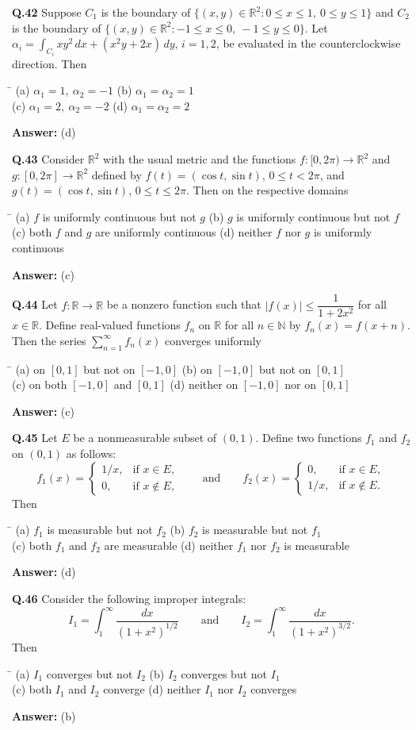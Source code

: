 \documentclass[11pt,a4paper]{article}
\newcommand{\optsfour}[4]{%
  \begin{tabbing}
    \hspace{0.48\linewidth}\=\kill
    (a) #1 \> (b) #2 \\[2pt]
    (c) #3 \> (d) #4
  \end{tabbing}%
}
\newcommand{\ans}[1]{\textbf{Answer:} #1\par\medskip}
\begin{document}
\textbf{Q.42} Suppose $C_1$ is the boundary of $\{(x,y) \in \mathbb{R}^2 : 0 \le x \le 1,\ 0 \le y \le 1\}$ and $C_2$ is the boundary of $\{(x,y) \in \mathbb{R}^2 : -1 \le x \le 0,\ -1 \le y \le 0\}$. Let $\alpha_i = \displaystyle\int_{C_i} xy^2\,dx + (x^2 y + 2x)\,dy$, $i = 1, 2$, be evaluated in the counterclockwise direction. Then
\optsfour{$\alpha_1 = 1,\ \alpha_2 = -1$}{$\alpha_1 = \alpha_2 = 1$}{$\alpha_1 = 2,\ \alpha_2 = -2$}{$\alpha_1 = \alpha_2 = 2$}
\ans{(d)}

\textbf{Q.43} Consider $\mathbb{R}^2$ with the usual metric and the functions $f : [0, 2\pi) \to \mathbb{R}^2$ and $g : [0, 2\pi] \to \mathbb{R}^2$ defined by $f(t) = (\cos t, \sin t)$, $0 \le t < 2\pi$, and $g(t) = (\cos t, \sin t)$, $0 \le t \le 2\pi$. Then on the respective domains
\optsfour{$f$ is uniformly continuous but not $g$}{$g$ is uniformly continuous but not $f$}{both $f$ and $g$ are uniformly continuous}{neither $f$ nor $g$ is uniformly continuous}
\ans{(c)}

\textbf{Q.44} Let $f : \mathbb{R} \to \mathbb{R}$ be a nonzero function such that $|f(x)| \le \dfrac{1}{1 + 2x^2}$ for all $x \in \mathbb{R}$. Define real-valued functions $f_n$ on $\mathbb{R}$ for all $n \in \mathbb{N}$ by $f_n(x) = f(x + n)$. Then the series $\displaystyle\sum_{n=1}^{\infty} f_n(x)$ converges uniformly
\optsfour{on $[0, 1]$ but not on $[-1, 0]$}{on $[-1, 0]$ but not on $[0, 1]$}{on both $[-1, 0]$ and $[0, 1]$}{neither on $[-1, 0]$ nor on $[0, 1]$}
\ans{(c)}

\textbf{Q.45} Let $E$ be a nonmeasurable subset of $(0, 1)$. Define two functions $f_1$ and $f_2$ on $(0, 1)$ as follows:
\[
  f_1(x) = \begin{cases} 1/x, & \text{if } x \in E, \\ 0, & \text{if } x \notin E, \end{cases}
  \qquad \text{and} \qquad
  f_2(x) = \begin{cases} 0, & \text{if } x \in E, \\ 1/x, & \text{if } x \notin E. \end{cases}
\]
Then
\optsfour{$f_1$ is measurable but not $f_2$}{$f_2$ is measurable but not $f_1$}{both $f_1$ and $f_2$ are measurable}{neither $f_1$ nor $f_2$ is measurable}
\ans{(d)}

\textbf{Q.46} Consider the following improper integrals:
\[
  I_1 = \int_1^\infty \frac{dx}{(1 + x^2)^{1/2}} \qquad \text{and} \qquad I_2 = \int_1^\infty \frac{dx}{(1 + x^2)^{3/2}}.
\]
Then
\optsfour{$I_1$ converges but not $I_2$}{$I_2$ converges but not $I_1$}{both $I_1$ and $I_2$ converge}{neither $I_1$ nor $I_2$ converges}
\ans{(b)}
\end{document}
